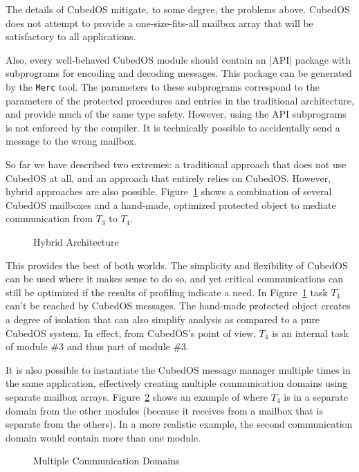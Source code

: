 The details of CubedOS mitigate, to some degree, the problems above. CubedOS does not attempt to
provide a one-size-fits-all mailbox array that will be satisfactory to all applications.

Also, every well-behaved CubedOS module should contain an |API| package with subprograms for
encoding and decoding messages. This package can be generated by the \texttt{Merc} tool. The
parameters to these subprograms correspond to the parameters of the protected procedures and
entries in the traditional architecture, and provide much of the same type safety. However,
using the API subprograms is not enforced by the compiler. It is technically possible to accidentally
send a message to the wrong mailbox.

So far we have described two extremes: a traditional approach that does not use CubedOS at all,
and an approach that entirely relies on CubedOS. However, hybrid approaches are also possible.
Figure~\ref{fig:hybrid-architecture} shows a combination of several CubedOS mailboxes and a
hand-made, optimized protected object to mediate communication from $T_3$ to $T_4$.

\begin{figure}[tbhp]
  \center
  \caption{Hybrid Architecture}
  \label{fig:hybrid-architecture}
\end{figure}

This provides the best of both worlds. The simplicity and flexibility of CubedOS can be used
where it makes sense to do so, and yet critical communications can still be optimized if the
results of profiling indicate a need. In Figure~\ref{fig:hybrid-architecture} task $T_4$ can't
be reached by CubedOS messages. The hand-made protected object creates a degree of isolation
that can also simplify analysis as compared to a pure CubedOS system. In effect, from CubedOS's
point of view, $T_4$ is an internal task of module \#3 and thus part of module \#3.

It is also possible to instantiate the CubedOS message manager multiple times in the same
application, effectively creating multiple communication domains using separate mailbox arrays.
Figure~\ref{fig:multi-domain} shows an example of where $T_4$ is in a separate domain from the
other modules (because it receives from a mailbox that is separate from the others). In a more
realistic example, the second communication domain would contain more than one module.

\begin{figure}[tbhp]
  \center
  \caption{Multiple Communication Domains}
  \label{fig:multi-domain}
\end{figure}

